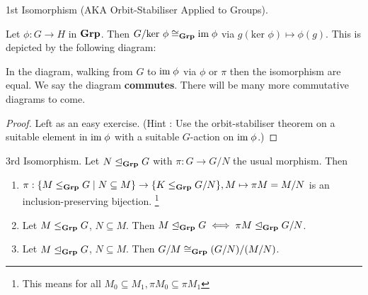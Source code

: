 \documentclass[../book.tex]{subfiles}
\begin{document}
\begin{thm} 1st Isomorphism (AKA Orbit-Stabiliser Applied to Groups). 
    
    Let $\phi : G \to H$ in $\mathbf{Grp}$. 
    Then $G / \text{ker } \phi \cong_{\mathbf{Grp}} \textnormal{im}\; \phi$ 
    via $g(\text{ker }\phi) \mapsto \phi(g)$.
    This is depicted by the following diagram:
    \begin{figure}[ht]
        \centering
    \end{figure}
    In the diagram, walking from $G$ to $\textnormal{im}\; \phi$ via 
    $\phi$ or $\pi$ then the isomorphism are equal. 
    We say the diagram \textbf{commutes}. 
    There will be many more commutative diagrams to come. 
\end{thm}
\begin{proof}
    Left as an easy exercise. 
    (Hint : Use the orbit-stabiliser theorem
    on a suitable element in $\textnormal{im}\; \phi$ with a suitable $G$-action on $\textnormal{im}\; \phi$.)
\end{proof}
\begin{thm} 3rd Isomorphism. 
    Let $N \trianglelefteq_{\mathbf{Grp}} G$ with $\pi : G \to G/N$ the usual morphism. Then
    \begin{enumerate}
        \item $\pi : 
        \{M \leq_{\mathbf{Grp}} G \mid N \subseteq M\} \to \{K \leq_{\mathbf{Grp}} G/N\}, 
        M \mapsto \pi M = M/N$ is an inclusion-preserving bijection.
        \footnote{This means for all $M_0\subseteq M_1,
        \pi M_0 \subseteq \pi M_1$}
        \item Let $M \leq_{\mathbf{Grp}} G$, $N \subseteq M$. 
        Then $M \trianglelefteq_{\mathbf{Grp}} G \iff \pi M \trianglelefteq_{\mathbf{Grp}} G/N$. 
        \item Let $M \trianglelefteq_{\mathbf{Grp}} G$, $N \subseteq M$. 
        Then $G / M \cong_{\mathbf{Grp}} (G / N) / (M / N)$. 
    \end{enumerate}
    
\end{thm}
\end{document}
